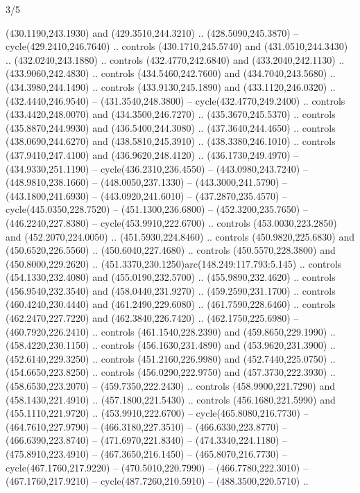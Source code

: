\begin{flagdescription}{3/5}
\begin{scope}[xshift=0.5\flaglength,yshift=0.5\flagwidth,scale=\flagwidth/768]
\begin{scope}[y=0.80pt, x=0.80pt, yscale=-1.75, xscale=1.75,xshift=-74mm,yshift=-108mm]
\begin{scope}[shift={(-236.93803,83.83961)},fill=cc8a400]
  (430.1190,243.1930) and (429.3510,244.3210) .. (428.5090,245.3870) --
  cycle(429.2410,246.7640) .. controls (430.1710,245.5740) and
  (431.0510,244.3430) .. (432.0240,243.1880) .. controls (432.4770,242.6840) and
  (433.2040,242.1130) .. (433.9060,242.4830) .. controls (434.5460,242.7600) and
  (434.7040,243.5680) .. (434.3980,244.1490) .. controls (433.9130,245.1890) and
  (433.1120,246.0320) .. (432.4440,246.9540) -- (431.3540,248.3800) --
  cycle(432.4770,249.2400) .. controls (433.4420,248.0070) and
  (434.3500,246.7270) .. (435.3670,245.5370) .. controls (435.8870,244.9930) and
  (436.5400,244.3080) .. (437.3640,244.4650) .. controls (438.0690,244.6270) and
  (438.5810,245.3910) .. (438.3380,246.1010) .. controls (437.9410,247.4100) and
  (436.9620,248.4120) .. (436.1730,249.4970) -- (434.9330,251.1190) --
  cycle(436.2310,236.4550) -- (443.0980,243.7240) -- (448.9810,238.1660) --
  (448.0050,237.1330) -- (443.3000,241.5790) -- (443.1800,241.6930) --
  (443.0920,241.6010) -- (437.2870,235.4570) -- cycle(445.0350,228.7520) --
  (451.1300,236.6800) -- (452.3200,235.7650) -- (446.2240,227.8380) --
  cycle(453.9910,222.6700) .. controls (453.0030,223.2850) and
  (452.2070,224.0050) .. (451.5930,224.8460) .. controls (450.9820,225.6830) and
  (450.6520,226.5560) .. (450.6040,227.4680) .. controls (450.5570,228.3800) and
  (450.8000,229.2620) .. (451.3370,230.1250)arc(148.249:117.793:5.145) ..
  controls (454.1330,232.4080) and (455.0190,232.5700) .. (455.9890,232.4620) ..
  controls (456.9540,232.3540) and (458.0440,231.9270) .. (459.2590,231.1700) ..
  controls (460.4240,230.4440) and (461.2490,229.6080) .. (461.7590,228.6460) ..
  controls (462.2470,227.7220) and (462.3840,226.7420) .. (462.1750,225.6980) --
  (460.7920,226.2410) .. controls (461.1540,228.2390) and (459.8650,229.1990) ..
  (458.4220,230.1150) .. controls (456.1630,231.4890) and (453.9620,231.3900) ..
  (452.6140,229.3250) .. controls (451.2160,226.9980) and (452.7440,225.0750) ..
  (454.6650,223.8250) .. controls (456.0290,222.9750) and (457.3730,222.3930) ..
  (458.6530,223.2070) -- (459.7350,222.2430) .. controls (458.9900,221.7290) and
  (458.1430,221.4910) .. (457.1800,221.5430) .. controls (456.1680,221.5990) and
  (455.1110,221.9720) .. (453.9910,222.6700) -- cycle(465.8080,216.7730) --
  (464.7610,227.9790) -- (466.3180,227.3510) -- (466.6330,223.8770) --
  (466.6390,223.8740) -- (471.6970,221.8340) -- (474.3340,224.1180) --
  (475.8910,223.4910) -- (467.3650,216.1450) -- (465.8070,216.7730) --
  cycle(467.1760,217.9220) -- (470.5010,220.7990) -- (466.7780,222.3010) --
  (467.1760,217.9210) -- cycle(487.7260,210.5910) -- (488.3500,220.5710) ..

\end{scope}
\end{scope}
\end{scope}
\end{flagdescription}
